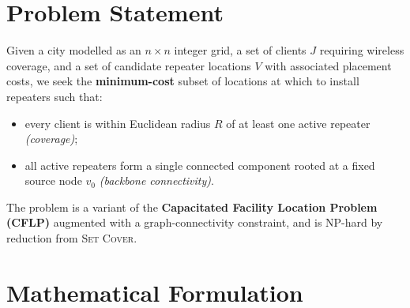\documentclass[10pt,a4paper,twocolumn]{article}
\begin{document}


\section{Problem Statement}

Given a city modelled as an $n{\times}n$ integer grid, a set of
clients $J$ requiring wireless coverage, and a set of candidate
repeater locations $V$ with associated placement costs, we seek the
\textbf{minimum-cost} subset of locations at which to install repeaters
such that:
\begin{itemize}
  \item every client is within Euclidean radius $R$ of at least one
        active repeater \emph{(coverage)};
  \item all active repeaters form a single connected component rooted
        at a fixed source node $v_0$ \emph{(backbone connectivity)}.
\end{itemize}
The problem is a variant of the \textbf{Capacitated Facility Location
Problem (CFLP)} augmented with a graph-connectivity constraint,
and is NP-hard by reduction from \textsc{Set Cover}.

\section{Mathematical Formulation}
\end{document}
